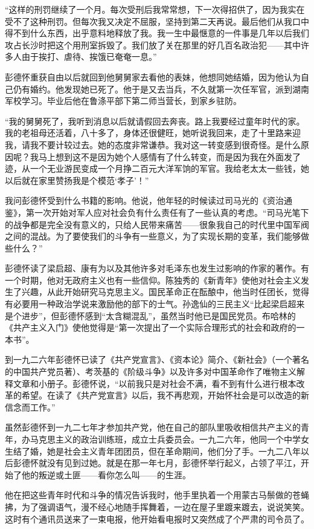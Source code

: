 \documentclass[10pt]{book}
\begin{document}
“这样的刑罚继续了一个月。每次受刑后我常常想，下一次得招供了，因为我实在受不了这种刑罚。但每次我又决定不屈服，坚持到第二天再说。最后他们从我口中得不到什么东西，出乎意料地释放了我。我一生中最惬意的一件事是几年以后我们攻占长沙时把这个用刑室拆毁了。我们放了关在那里的好几百名政治犯——其中许多人由于挨打、虐待、挨饿已奄奄一息。”

彭德怀重获自由以后就回到他舅舅家去看他的表妹，他想同她结婚，因为他认为自己仍有婚约。他发现她已死了。他于是又去当兵，不久就第一次任军官，派到湖南军校学习。毕业后他在鲁涤平部下第二师当营长，到家乡驻防。

“我的舅舅死了，我听到消息以后就请假回去奔丧。路上我要经过童年时代的家。我的老祖母还活着，八十多了，身体还很健旺，她听说我回来，走了十里路来迎我，请我不要计较过去。她的态度非常谦恭。我对这一转变感到很奇怪。是什么原因呢？我马上想到这不是因为她个人感情有了什么转变，而是因为我在外面发了迹，从一个无业游民变成一个月挣二百元大洋军饷的军官。我给老太太一些钱，她以后就在家里赞扬我是个模范‘孝子’！”

我问彭德怀受到什么书籍的影响。他说，他年轻的时候读过司马光的《资治通鉴》，第一次开始对军人应对社会负有什么责任有了一些认真的考虑。“司马光笔下的战争都是完全没有意义的，只给人民带来痛苦——很象我自己的时代里中国军阀之间的混战。为了要使我们的斗争有一些意义，为了实现长期的变革，我们能够做些什么？”

彭德怀读了梁启超、康有为以及其他许多对毛泽东也发生过影响的作家的著作。有一个时期，他对无政府主义也有一些信仰。陈独秀的《新青年》使他对社会主义发生了兴趣，从此开始研究马克思主义。国民革命正在酝酿中，他当时任团长，觉得有必要用一种政治学说来激励他的部下的士气。孙逸仙的三民主义“比起梁启超来是个进步”，但彭德怀感到“太含糊混乱”，虽然当时他已是国民党员。布哈林的《共产主义入门》使他觉得是“第一次提出了一个实际合理形式的社会和政府的一本书”。

到一九二六年彭德怀已读了《共产党宣言》、《资本论》简介、《新社会》（一个著名的中国共产党员著）、考茨基的《阶级斗争》以及许多对中国革命作了唯物主义解释文章和小册子。彭德怀说，“以前我只是对社会不满，看不到有什么进行根本改革的希望。在读了《共产党宣言》以后，我不再悲观，开始怀社会是可以改造的新信念而工作。”

虽然彭德怀到一九二七年才参加共产党，他在自己的部队里吸收相信共产主义的青年，办马克思主义的政治训练班，成立士兵委员会。一九二六年，他同一个中学女生结了婚，她是社会主义青年团团员，但在革命期间，他们分了手。一九二八年以后彭德怀就没有见到过她。就是在那一年七月，彭德怀举行起义，占领了平江，开始了他的叛逆或土匪——看你怎么叫——的生涯。

他在把这些青年时代和斗争的情况告诉我时，他手里执着一个用蒙古马鬃做的苍蝇拂，为了强调语气，漫不经心地随手挥舞着，一边在屋子里踱来踱去，说说笑笑。这时有个通讯员送来了一束电报，他开始看电报时又突然成了个严肃的司令员了。
\end{document}
